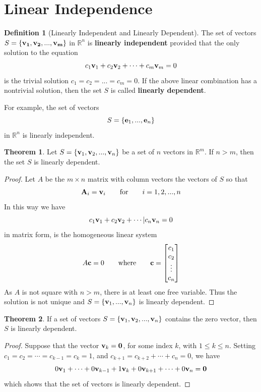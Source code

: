 \documentclass{article}
\renewcommand{\bf}[1]{\textbf{#1}}
\theoremstyle{definition}
\newtheorem{theorem}{Theorem}
\newtheorem{definition}{Definition}
\newcommand{\reals}{\mathbb{R}}
\newcommand{\bmat}[1]{\begin{bmatrix}#1\end{bmatrix}}
\begin{document}
\section{Linear Independence}
\begin{definition}[Linearly Independent and Linearly Dependent]
	The set of vectors $S = \{\vb{v_1, v_2, ..., v_m}\}$ in $\reals^n$ is \bf{linearly independent} provided that the only solution to the equation
	\[ c_1\vb{v}_1 + c_2\vb{v}_2 + \cdots + c_m\vb{v}_m = 0 \]
	is the trivial solution $c_1 = c_2 = ... = c_m = 0$. If the above linear combination has a nontrivial solution, then the set $S$ is called \bf{linearly dependent}.
\end{definition}
For example, the set of vectors
\[ S = \{ \vb{e}_1, ..., \vb{e}_n \} \]
in $\reals^n$ is linearly independent.
\begin{theorem}
	Let $S = \{ \vb{v}_1, \vb{v}_2, ..., \vb{v}_n \}$ be a set of $n$ vectors in $\reals^m$. If $n > m$, then the set $S$ is linearly dependent.
	\begin{proof}
		Let $A$ be the $m \times n$ matrix with column vectors the vectors of $S$ so that
		\[ \vb{A}_i = \vb{v}_i \qquad \text{for} \qquad i = 1, 2, ..., n \]
		In this way we have
		\[ c_1\vb{v}_1 + c_2\vb{v}_2 + \cdots | c_n\vb{v}_n = 0 \]
		in matrix form, is the homogeneous linear system
		\[ A\vb{c} = 0 \qquad \text{where} \qquad \vb{c} = \bmat{c_1\\c_2\\\vdots\\c_n} \]
		As $A$ is not square with $n > m$, there is at least one free variable. Thus the solution is not unique and $S = \{ \vb{v}_1, ..., \vb{v}_n \}$ is linearly dependent.
	\end{proof}
\end{theorem}
\begin{theorem}
	If a set of vectors $S = \{ \vb{v}_1, \vb{v}_2, ..., \vb{v}_n \}$ contains the zero vector, then $S$ is linearly dependent.
	\begin{proof}
		Suppose that the vector $\vb{v}_k =\vb{0}$, for some index $k$, with $1 \leq k \leq n$. Setting $c_1 = c_2 = \cdots = c_{k-1} = c_k = 1$, and $c_{k+1} = c_{k+2} + \cdots + c_n = 0$, we have
		\[ 0\vb{v}_1 + \cdots + 0\vb{v}_{k-1} + 1\vb{v}_k + 0\vb{v}_{k+1} + \cdots + 0\vb{v}_n = \vb{0} \]
		which shows that the set of vectors is linearly dependent.
	\end{proof}
\end{theorem}
\end{document}
